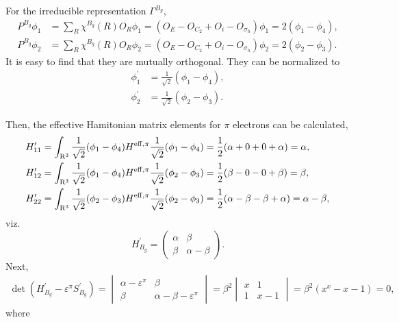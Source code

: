 \documentclass[a4paper]{book}
\newcommand{\Heff}{H^{\rm eff,\pi}}
\newcommand{\Hp}{H^\prime}
\newcommand{\Sp}{S^\prime}
\newcommand{\RRR}{{\rm R}^3}
\begin{document}
\begin{solution}
\begin{enumerate}[label=(\alph*)]
		For the irreducible representation $\Gamma^{B_g}$,
		\begin{align*}
		P^{B_g}\phi_1 &= \sum_{R} \chi^{B_g}(R) O_R \phi_1 = (O_E - O_{C_2} + O_{i} - O_{\sigma_h})\phi_1 = 2(\phi_1-\phi_4) , \\
		P^{B_g}\phi_2 &= \sum_{R} \chi^{B_g}(R) O_R \phi_2 = (O_E - O_{C_2} + O_{i} - O_{\sigma_h})\phi_2 = 2(\phi_2-\phi_3) .
		\end{align*}
		It is easy to find that they are mutually orthogonal. They can be normalized to
		\begin{align*}
		\phi^\prime_1 &= \frac{1}{\sqrt{2}} (\phi_1-\phi_4) , \\
		\phi^\prime_2 &= \frac{1}{\sqrt{2}} (\phi_2-\phi_3) .
		\end{align*}
		
		Then, the effective Hamitonian matrix elements for $\pi$ electrons can be calculated,
		\begin{align*}
		\Hp_{11} &= \int_{\RRR} \frac{1}{\sqrt{2}}(\phi_1-\phi_4) \Heff \frac{1}{\sqrt{2}}(\phi_1-\phi_4) = \frac{1}{2} (\alpha + 0 + 0 + \alpha) = \alpha, \\
		\Hp_{12} &= \int_{\RRR} \frac{1}{\sqrt{2}}(\phi_1-\phi_4) \Heff \frac{1}{\sqrt{2}}(\phi_2-\phi_3) = \frac{1}{2} (\beta - 0 - 0 + \beta) = \beta, \\
		\Hp_{22} &= \int_{\RRR} \frac{1}{\sqrt{2}}(\phi_2-\phi_3) \Heff \frac{1}{\sqrt{2}}(\phi_2-\phi_3) = \frac{1}{2} (\alpha - \beta - \beta + \alpha) = \alpha - \beta,
		\end{align*}
		viz.
		\begin{equation*}
			\Hp_{B_g} = \begin{pmatrix}
				\alpha	&	\beta \\ \beta & \alpha - \beta 
			\end{pmatrix}.
		\end{equation*}
		Next,
		\begin{align*}
			\det(\Hp_{B_g}-\varepsilon^\pi \Sp_{B_g}) = \begin{vmatrix}	
			\alpha-\varepsilon^\pi	&	\beta \\ 
			\beta & \alpha - \beta -\varepsilon^\pi	
\end{vmatrix} = \beta^2
\begin{vmatrix}
			x & 1 \\ 1 & x -1			
			\end{vmatrix} = \beta^2 ( x^x - x - 1 ) = 0,
		\end{align*}
		where
		\begin{equation*}

\end{equation*}
\end{enumerate}
\end{solution}
\end{document}

